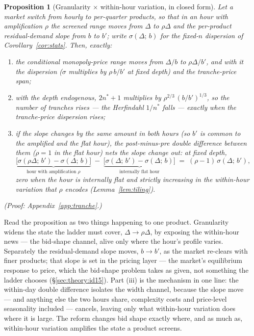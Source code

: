 \documentclass[11pt,a4paper]{article}
\newtheorem{proposition}{Proposition}
\theoremstyle{definition}
\theoremstyle{remark}
\theoremstyle{plain}
\begin{document}
\begin{proposition}[Granularity $\times$ within-hour variation, in closed form]\label{cor:did}
Let a market switch from hourly to per-quarter products, so that in an hour with amplification $\rho$ the screened range moves from $\Delta$ to $\rho\Delta$ and the per-product residual-demand slope from $b$ to $b'$; write $\sigma(\Delta;\, b)$ for the fixed-$n$ dispersion of Corollary~\ref{cor:stats}. Then, exactly:
\begin{enumerate}[label=\textup{(\roman*)}, leftmargin=2.2em, itemsep=3pt, topsep=3pt]
  \item the conditional monopoly-price range moves from $\Delta/b$ to $\rho\Delta/b'$, and with it the dispersion ($\sigma$ multiplies by $\rho\, b/b'$ at fixed depth) and the tranche-price span;
  \item with the depth endogenous, $2n^*+1$ multiplies by $\rho^{2/3}\,(b/b')^{1/3}$, so the number of tranches rises --- the Herfindahl $1/n^*$ falls --- exactly when the tranche-price dispersion rises;
  \item \emph{if the slope changes by the same amount in both hours} (so $b'$ is common to the amplified and the flat hour), the post-minus-pre double difference between them ($\rho = 1$ in the flat hour) nets the slope change out: at fixed depth,
  \[
  \underbrace{\bigl[\sigma(\rho\Delta;\, b') - \sigma(\Delta;\, b)\bigr]}_{\text{hour with amplification }\rho}
  \;-\;
  \underbrace{\bigl[\sigma(\Delta;\, b') - \sigma(\Delta;\, b)\bigr]}_{\text{internally flat hour}}
  \;=\;
  (\rho - 1)\,\sigma(\Delta;\, b'),
  \]
  zero when the hour is internally flat and strictly increasing in the within-hour variation that $\rho$ encodes (Lemma~\ref{lem:tiling}).
\end{enumerate}
(Proof: Appendix~\ref{app:tranche}.)
\end{proposition}

Read the proposition as two things happening to one product. Granularity widens the state the ladder must cover, $\Delta \to \rho\Delta$, by exposing the within-hour news --- the bid-shape channel, alive only where the hour's profile varies. Separately the residual-demand slope moves, $b \to b'$, as the market re-clears with finer products; that slope is set in the pricing layer --- the market's equilibrium response to price, which the bid-shape problem takes as given, not something the ladder chooses (\S\ref{sec:theory:id15}). Part (iii) is the mechanism in one line: the within-day double difference isolates the width channel, because the slope move --- and anything else the two hours share, complexity costs and price-level seasonality included --- cancels, leaving only what within-hour variation does where it is large. The reform changes bid shape exactly where, and as much as, within-hour variation amplifies the state a product screens.
\end{document}
